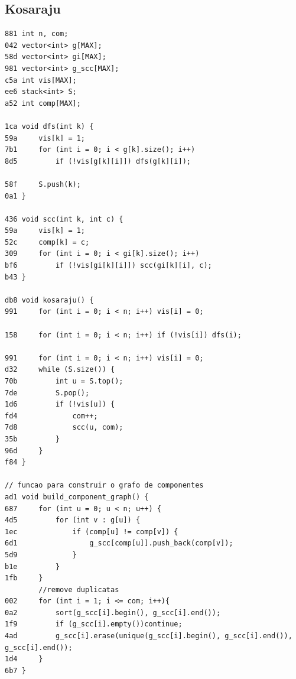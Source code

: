\documentclass[11pt, a4paper, twoside]{article}
\begin{document}
\subsection{Kosaraju}
\begin{lstlisting}
881 int n, com;
042 vector<int> g[MAX];
58d vector<int> gi[MAX];
981 vector<int> g_scc[MAX]; 
c5a int vis[MAX];
ee6 stack<int> S;
a52 int comp[MAX];

1ca void dfs(int k) {
59a 	vis[k] = 1;
7b1 	for (int i = 0; i < g[k].size(); i++)
8d5 		if (!vis[g[k][i]]) dfs(g[k][i]);
    
58f 	S.push(k);
0a1 }

436 void scc(int k, int c) {
59a 	vis[k] = 1;
52c 	comp[k] = c;
309 	for (int i = 0; i < gi[k].size(); i++)
bf6 		if (!vis[gi[k][i]]) scc(gi[k][i], c);
b43 }

db8 void kosaraju() {
991 	for (int i = 0; i < n; i++) vis[i] = 0;
    
158 	for (int i = 0; i < n; i++) if (!vis[i]) dfs(i);
    
991 	for (int i = 0; i < n; i++) vis[i] = 0;
d32 	while (S.size()) {
70b 		int u = S.top();
7de 		S.pop();
1d6 		if (!vis[u]) {
fd4             com++;
7d8             scc(u, com);
35b         }
96d     }
f84 }

// funcao para construir o grafo de componentes
ad1 void build_component_graph() {
687     for (int u = 0; u < n; u++) {
4d5         for (int v : g[u]) {
1ec             if (comp[u] != comp[v]) {
6d1                 g_scc[comp[u]].push_back(comp[v]);
5d9             }
b1e         }
1fb     }
        //remove duplicatas
002     for (int i = 1; i <= com; i++){
0a2         sort(g_scc[i].begin(), g_scc[i].end());
1f9         if (g_scc[i].empty())continue;
4ad         g_scc[i].erase(unique(g_scc[i].begin(), g_scc[i].end()), g_scc[i].end());
1d4     }
6b7 }
\end{lstlisting}
\end{document}
